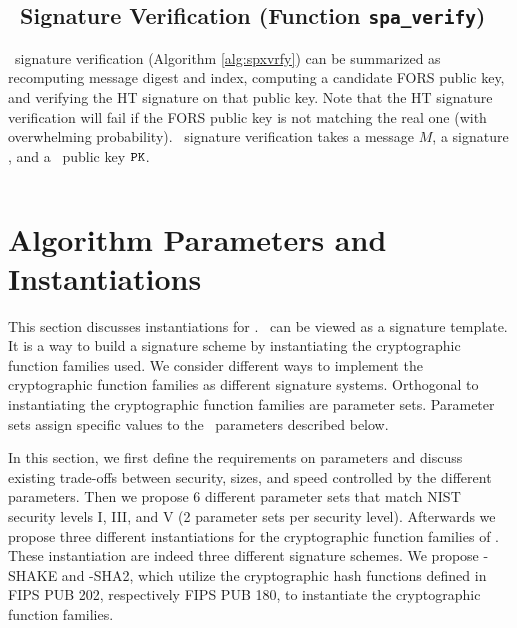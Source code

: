 \begin{algorithm}[ht]
    \inputminted[breaklines,linenos,tabsize=2,mathescape,escapeinside=||]{C}{paper/code/spa_sign.cs}
    \caption{ \texttt{spa\_sign} --- Generating a \SPHINCSA\ signature.}
    \label{alg:spxsign}
\end{algorithm}

\subsection{\SPHINCSA\ Signature Verification (Function \texttt{spa\_verify})}

\SPHINCSA\ signature verification (Algorithm \ref{alg:spxvrfy}) can be summarized as recomputing message digest and index, computing a candidate FORS public key, and verifying the HT signature on that public key. Note that the HT signature verification will fail if the FORS public key is not matching the real one (with overwhelming probability). \SPHINCSA\ signature verification takes a message $M$, a signature \sig, and a \SPHINCSA\ public key $\pk$.

\begin{algorithm}[ht]
    \inputminted[breaklines,linenos,tabsize=2,mathescape,escapeinside=||]{C}{paper/code/spa_verify.cs}
    \caption{ \texttt{spa\_verify} --- Verify a \SPHINCSA\ signature $\bf SIG$ on a message $M$ using a \SPHINCSA\ public key $\bf PK$.}
    \label{alg:spxvrfy}
\end{algorithm}

\section{Algorithm Parameters and Instantiations}
\label{sec:instantiations}

This section discusses instantiations for \SPHINCSA. \SPHINCSA\ can be viewed as a signature template. It is a way to build a signature scheme by instantiating the cryptographic function families used. We consider different ways to implement the cryptographic function families as different signature systems. Orthogonal to instantiating the cryptographic function families are parameter sets. Parameter sets assign specific values to the \SPHINCSA\ parameters described below.

In this section, we first define the requirements on parameters and discuss existing trade-offs between security, sizes, and speed controlled by the different parameters. Then we propose 6 different parameter sets that match NIST security levels I, III, and V (2 parameter sets per security level). Afterwards we propose three different instantiations for the cryptographic function families of \SPHINCSA. These instantiation are indeed three different signature schemes. We propose \SPHINCSA-SHAKE and \SPHINCSA-SHA2, which utilize the cryptographic hash functions defined in FIPS PUB 202, respectively FIPS PUB 180, to instantiate the cryptographic function families.


